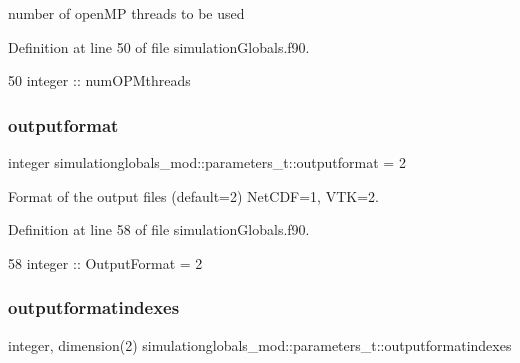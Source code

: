 number of open\+MP threads to be used 



Definition at line 50 of file simulation\+Globals.\+f90.


\begin{DoxyCode}
50         \textcolor{keywordtype}{integer}         :: numOPMthreads
\end{DoxyCode}
\mbox{\label{structsimulationglobals__mod_1_1parameters__t_a455601cb209772820789bdfd696628d2}} 
\subsubsection{\texorpdfstring{outputformat}{outputformat}}
{\footnotesize\ttfamily integer simulationglobals\+\_\+mod\+::parameters\+\_\+t\+::outputformat = 2\hspace{0.3cm}{\ttfamily [private]}}



Format of the output files (default=2) Net\+C\+DF=1, V\+TK=2. 



Definition at line 58 of file simulation\+Globals.\+f90.


\begin{DoxyCode}
58         \textcolor{keywordtype}{integer}         :: OutputFormat = 2
\end{DoxyCode}
\mbox{\label{structsimulationglobals__mod_1_1parameters__t_ac4e90208e4fb5c5fc0a673b03fc908d7}} 
\subsubsection{\texorpdfstring{outputformatindexes}{outputformatindexes}}
{\footnotesize\ttfamily integer, dimension(2) simulationglobals\+\_\+mod\+::parameters\+\_\+t\+::outputformatindexes\hspace{0.3cm}{\ttfamily [private]}}



